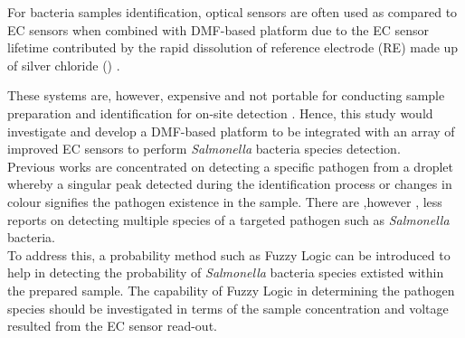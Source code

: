 For bacteria samples identification, optical sensors are often used as compared to EC sensors when combined with DMF-based platform due to the EC sensor lifetime contributed by the rapid dissolution of reference electrode (RE) made up of silver chloride () \cite{farzbodIntegrationReconfigurablePotentiometric2018}.\newpage

These systems are, however, expensive and not portable for conducting sample preparation and identification for on-site detection \cite{andersonThinfilmtransistorDigitalMicrofluidics2021}. Hence, this study would investigate and develop a DMF-based platform to be integrated with an array of improved EC sensors to perform \emph{Salmonella} bacteria species detection.\\

Previous works are concentrated on detecting a specific pathogen from a droplet \cite{andersonThinfilmtransistorDigitalMicrofluidics2021,foudehRapidMultiplexDetection2015,luSensitiveAutomatedDetection2023 ,sistaDigitalMicrofluidicPlatform2011} whereby a singular peak detected during the identification process or changes in colour signifies the pathogen existence in the sample. There are ,however ,  less reports on detecting multiple species of a targeted pathogen such as \emph{Salmonella} bacteria.\\

To address this, a probability method such as Fuzzy Logic can be introduced to help in detecting the probability of \emph{Salmonella} bacteria species extisted within the prepared sample. The capability of Fuzzy Logic in determining the pathogen species should be investigated in terms of the sample concentration and voltage resulted from the EC sensor read-out.
